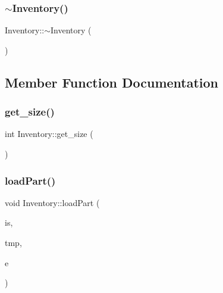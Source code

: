 \mbox{\label{class_inventory_a6c6dfcb6d977c74a7abf46809e892e3d}} 
\subsubsection{\texorpdfstring{$\sim$Inventory()}{~Inventory()}}
{\footnotesize\ttfamily Inventory\+::$\sim$\+Inventory (\begin{DoxyParamCaption}{ }\end{DoxyParamCaption})\hspace{0.3cm}{\ttfamily [inline]}}



\subsection{Member Function Documentation}
\mbox{\label{class_inventory_a3ccacc9422b01b2c17836ca804bcaafc}} 
\subsubsection{\texorpdfstring{get\_size()}{get\_size()}}
{\footnotesize\ttfamily int Inventory\+::get\+\_\+size (\begin{DoxyParamCaption}{ }\end{DoxyParamCaption})\hspace{0.3cm}{\ttfamily [inline]}}

\mbox{\label{class_inventory_a9dd64f268a7a5cca611b5f749ec33f96}} 
\subsubsection{\texorpdfstring{loadPart()}{loadPart()}}
{\footnotesize\ttfamily void Inventory\+::load\+Part (\begin{DoxyParamCaption}\item[{std\+::istream \&}]{is,  }\item[{\mbox{\hyperlink{struct_temp_input}{Temp\+Input}} \&}]{tmp,  }\item[{\mbox{\hyperlink{_inventory_8h_abddff37837f171d72a2e16a1448a3943}{enum\+Part}}}]{e }\end{DoxyParamCaption})}

